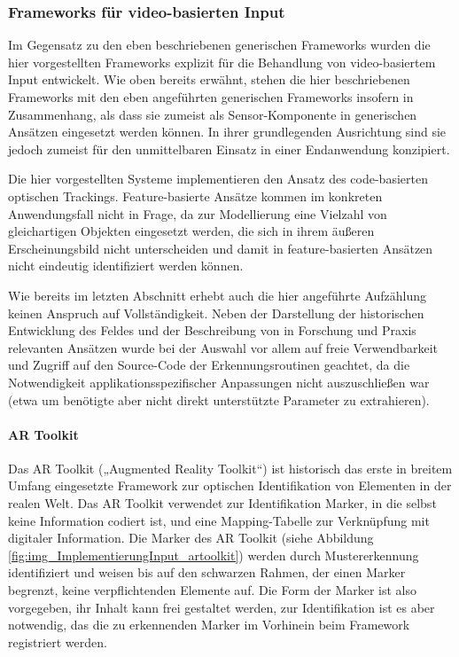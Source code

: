 
\subsubsection{Frameworks für video-basierten Input} %
\label{ssub:frameworks_für_video_basierten_input}

Im Gegensatz zu den eben beschriebenen generischen Frameworks wurden die hier vorgestellten Frameworks explizit für die Behandlung von video-basiertem Input entwickelt. Wie oben bereits erwähnt, stehen die hier beschriebenen Frameworks mit den eben angeführten generischen Frameworks insofern in Zusammenhang, als dass sie zumeist als Sensor-Komponente in generischen Ansätzen eingesetzt werden können. In ihrer grundlegenden Ausrichtung sind sie jedoch zumeist für den unmittelbaren Einsatz in einer Endanwendung konzipiert.

Die hier vorgestellten Systeme implementieren den Ansatz des code-basierten optischen Trackings. Feature-basierte Ansätze kommen im konkreten Anwendungsfall nicht in Frage, da zur Modellierung eine Vielzahl von gleichartigen Objekten eingesetzt werden, die sich in ihrem äußeren Erscheinungsbild nicht unterscheiden und damit in feature-basierten Ansätzen nicht eindeutig identifiziert werden können.

Wie bereits im letzten Abschnitt erhebt auch die hier angeführte Aufzählung keinen Anspruch auf Vollständigkeit. Neben der Darstellung der historischen Entwicklung des Feldes und der Beschreibung von in Forschung und Praxis relevanten Ansätzen wurde bei der Auswahl vor allem auf freie Verwendbarkeit und Zugriff auf den Source-Code der Erkennungsroutinen geachtet, da die Notwendigkeit applikationsspezifischer Anpassungen nicht auszuschließen war (etwa um benötigte aber nicht direkt unterstützte Parameter zu extrahieren).

\paragraph{AR Toolkit}\label{par:artoolkit}
Das AR Toolkit („Augmented Reality Toolkit“) \citep{Kato00} ist historisch das erste in breitem Umfang eingesetzte Framework zur optischen Identifikation von Elementen in der realen Welt. Das AR Toolkit verwendet zur Identifikation Marker, in die selbst keine Information codiert ist, und eine Mapping-Tabelle zur Verknüpfung mit digitaler Information. Die Marker des AR Toolkit (siehe Abbildung \ref{fig:img_ImplementierungInput_artoolkit}) werden durch Mustererkennung identifiziert und weisen bis auf den schwarzen Rahmen, der einen Marker begrenzt, keine verpflichtenden Elemente auf. Die Form der Marker ist also vorgegeben, ihr Inhalt kann frei gestaltet werden, zur Identifikation ist es aber notwendig, das die zu erkennenden Marker im Vorhinein beim Framework registriert werden. 

